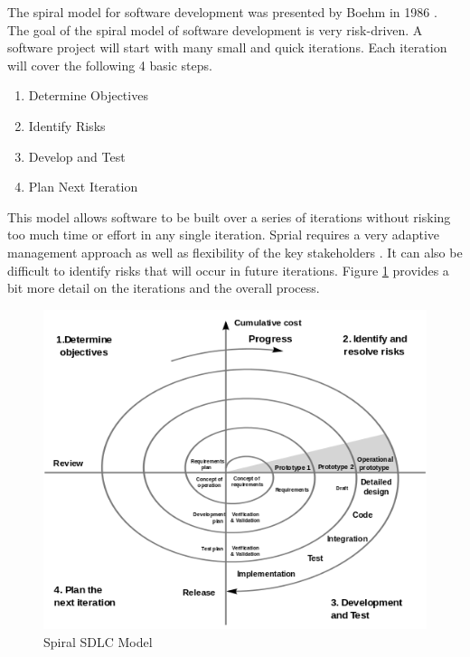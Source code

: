 \documentclass[SDSUThesis.tex]{subfiles}
\begin{document}
        The spiral model for software development was presented by Boehm in 1986
        \cite{Boehm1986, Boehm1988}. 
        The goal of the spiral model of software development is very risk-driven.
        A software project will start with many small and quick iterations. 
        Each iteration will cover the following 4 basic steps. 
        \begin{enumerate}
            \item Determine Objectives
            \item Identify Risks
            \item Develop and Test
            \item Plan Next Iteration
        \end{enumerate}
        This model allows software to be built over a series of iterations
        without risking too much time or effort in any single iteration.
        Sprial requires a very adaptive management approach
        as well as flexibility of the key stakeholders \cite{Ruparelia2010}.
        It can also be difficult to identify risks that will occur in future
        iterations.
        Figure \ref{fig:spiral} provides a bit more detail on the iterations
        and the overall process. 
        \begin{figure}[ht]
            \centering
            \includegraphics[scale=.8]{images/spiral_model.png}
            \caption[SPIRAL SDLC MODEL]{Spiral SDLC Model \cite{Boehm2000} }
            \label{fig:spiral}
        \end{figure}
        
\end{document}
